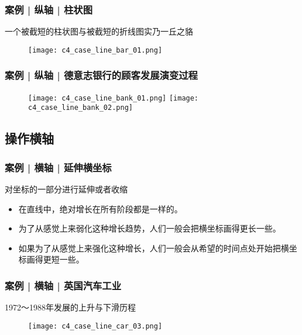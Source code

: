 \begin{frame}
  \frametitle{案例 | 纵轴 | 柱状图}
  \begin{block}{一个被截短的柱状图与被截短的折线图实乃一丘之貉}
  \begin{figure}
    \centering
    \texttt{[image: c4\_case\_line\_bar\_01.png]}
  \end{figure}
  \end{block}
\end{frame}

\begin{frame}
  \frametitle{案例 | 纵轴 | 德意志银行的顾客发展演变过程}
  \begin{figure}
    \centering
    \texttt{[image: c4\_case\_line\_bank\_01.png]}\quad
    \texttt{[image: c4\_case\_line\_bank\_02.png]}
  \end{figure}
\end{frame}

\subsection{操作横轴}
\begin{frame}
  \frametitle{案例 | 横轴 | 延伸横坐标}
  \begin{block}{对坐标的一部分进行延伸或者收缩}
    \begin{itemize}
      \item<1-> 在直线中，绝对增长在所有阶段都是一样的。
      \item<2-> 为了从感觉上来弱化这种增长趋势，人们一般会把横坐标画得更长一些。
      \item<3-> 如果为了从感觉上来强化这种增长，人们一般会从希望的时间点处开始把横坐标画得更短一些。
    \end{itemize}
    \begin{figure}
      \centering
    \end{figure}
  \end{block}
\end{frame}

\begin{frame}
  \frametitle{案例 | 横轴 | 英国汽车工业}
  \begin{block}{1972～1988年发展的上升与下滑历程}
    \begin{figure}
      \centering
      \texttt{[image: c4\_case\_line\_car\_03.png]}
    \end{figure}
  \end{block}
\end{frame}

